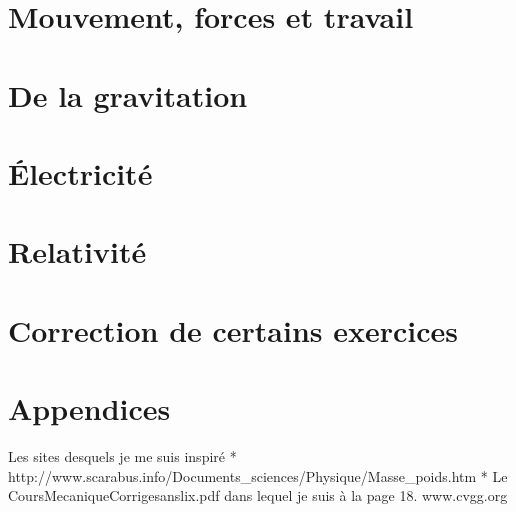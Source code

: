 \chapter{Mouvement, forces et travail}
	
	
	
	
	

\chapter{De la gravitation}
	

\chapter{Électricité}
	

\chapter{Relativité}
	

\chapter{Correction de certains exercices}
\immediate\closeout\FichCorr
	

\appendix

\chapter*{Appendices}

\pagestyle{plain}

\setcounter{section}{0}
\renewcommand{\theequation}{\Alph{section}.\arabic{equation}}
\renewcommand{\thenumtho}{\Alph{section}.\arabic{numtho}}
\renewcommand{\thesection}{\Alph{section}}



	
	
\printindex



Les sites desquels je me suis inspiré
  * http://www.scarabus.info/Documents_sciences/Physique/Masse_poids.htm
  * Le CoursMecaniqueCorrigesanslix.pdf dans lequel je suis à la page 18.
     www.cvgg.org

